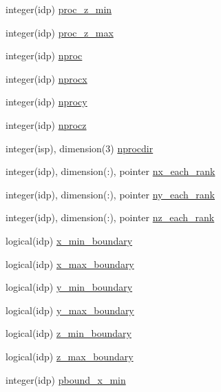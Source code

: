 \begin{DoxyCompactItemize}
\item 
integer(idp) \hyperlink{namespaceshared__data_a06a39cbc901b9e189a9d93eee920aeaa}{proc\+\_\+z\+\_\+min}
\item 
integer(idp) \hyperlink{namespaceshared__data_a8ef64b5a98510b366e28a0f32790c1cc}{proc\+\_\+z\+\_\+max}
\item 
integer(idp) \hyperlink{namespaceshared__data_a17ce7b1395fd76d2bb16c475d56cd08b}{nproc}
\item 
integer(idp) \hyperlink{namespaceshared__data_a83d7bbce1bbb5ff87a019c7ee7fa6f81}{nprocx}
\item 
integer(idp) \hyperlink{namespaceshared__data_a86495fbffc6b53172334c5fe8109fed8}{nprocy}
\item 
integer(idp) \hyperlink{namespaceshared__data_ab80ca6154fd93118dc6455ec5e12de43}{nprocz}
\item 
integer(isp), dimension(3) \hyperlink{namespaceshared__data_a73f0e719e591e27a33b1e75d95ae31cb}{nprocdir}
\item 
integer(idp), dimension(\+:), pointer \hyperlink{namespaceshared__data_a9ea44b080aed4db2eaa320878f266ace}{nx\+\_\+each\+\_\+rank}
\item 
integer(idp), dimension(\+:), pointer \hyperlink{namespaceshared__data_a1307d0cb9f9d652ec67954e53bf04706}{ny\+\_\+each\+\_\+rank}
\item 
integer(idp), dimension(\+:), pointer \hyperlink{namespaceshared__data_a39afe3f315d74dc819777e3345afbdd3}{nz\+\_\+each\+\_\+rank}
\item 
logical(idp) \hyperlink{namespaceshared__data_a1fb2edce254dcc9943d5a9d227ea3c58}{x\+\_\+min\+\_\+boundary}
\item 
logical(idp) \hyperlink{namespaceshared__data_aaa822590de7afd77e48ecc4d9016fe29}{x\+\_\+max\+\_\+boundary}
\item 
logical(idp) \hyperlink{namespaceshared__data_ac54278949a6918cd0e9ed158e4eadb52}{y\+\_\+min\+\_\+boundary}
\item 
logical(idp) \hyperlink{namespaceshared__data_a72d92c74a360b173dd6bc143b5b376b4}{y\+\_\+max\+\_\+boundary}
\item 
logical(idp) \hyperlink{namespaceshared__data_aaa333d54e2048c0199124fa66e0c460e}{z\+\_\+min\+\_\+boundary}
\item 
logical(idp) \hyperlink{namespaceshared__data_ac180e0f2fae72319d7a6be1f1bbf4bb3}{z\+\_\+max\+\_\+boundary}
\item 
integer(idp) \hyperlink{namespaceshared__data_ab9740d57cf165e22f3691c51de24c520}{pbound\+\_\+x\+\_\+min}

\end{DoxyCompactItemize}
